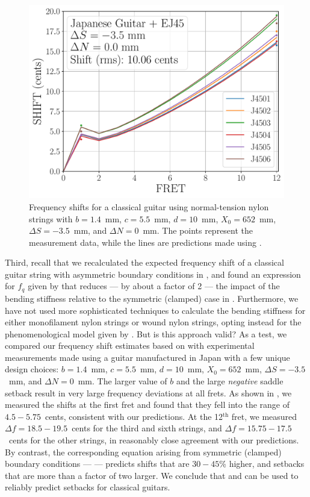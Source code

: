 \begin{figure}
  \centering
  \includegraphics[width=5.0in]{../figures/japan_guitar_ej45_shifts}
  \caption{\label{fig:japan_guitar_ej45_shifts} Frequency shifts for a classical guitar using normal-tension nylon strings with $b = 1.4$~mm, $c = 5.5$~mm, $d = 10$~mm, $X_0 = 652$~mm, $\Delta S = -3.5$~mm, and $\Delta N = 0$~mm. The points represent the measurement data, while the lines are predictions made using .}
\end{figure}

Third, recall that we recalculated the expected frequency shift of a classical guitar string with asymmetric boundary conditions in , and found an expression for $f_q$ given by  that reduces --- by about a factor of 2 --- the impact of the bending stiffness relative to the symmetric (clamped) case in . Furthermore, we have not used more sophisticated techniques to calculate the bending stiffness for either monofilament nylon strings or wound nylon strings, opting instead for the phenomenological model given by . But is this approach valid? As a test, we compared our frequency shift estimates based on  with experimental measurements made using a guitar manufactured in Japan with a few unique design choices: $b = 1.4$~mm, $c = 5.5$~mm, $d = 10$~mm, $X_0 = 652$~mm, $\Delta S = -3.5$~mm, and $\Delta N = 0$~mm. The larger value of $b$ and the large \emph{negative} saddle setback result in very large frequency deviations at all frets. As shown in , we measured the shifts at the first fret and found that they fell into the range of $4.5 - 5.75$~cents, consistent with our predictions. At the 12$^\mathrm{th}$ fret, we measured $\Delta f = 18.5 - 19.5$~cents for the third and sixth strings, and $\Delta f = 15.75 - 17.5$~cents for the other strings, in reasonably close agreement with our predictions. By contrast, the corresponding equation arising from symmetric (clamped) boundary conditions ---  --- predicts shifts that are $30 - 45$\% higher, and setbacks that are more than a factor of two larger. We conclude that  and  can be used to reliably predict setbacks for classical guitars.

